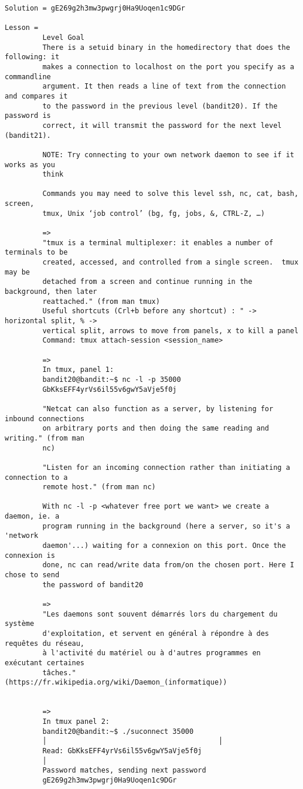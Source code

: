 \documentclass[a4paper]{report}
\begin{document}
\begin{verbatim}
Solution = gE269g2h3mw3pwgrj0Ha9Uoqen1c9DGr

Lesson = 
		 Level Goal
		 There is a setuid binary in the homedirectory that does the following: it
		 makes a connection to localhost on the port you specify as a commandline
		 argument. It then reads a line of text from the connection and compares it
		 to the password in the previous level (bandit20). If the password is 
		 correct, it will transmit the password for the next level (bandit21).
		 
		 NOTE: Try connecting to your own network daemon to see if it works as you
		 think

		 Commands you may need to solve this level ssh, nc, cat, bash, screen, 
		 tmux, Unix ‘job control’ (bg, fg, jobs, &, CTRL-Z, …)

		 => 
		 "tmux is a terminal multiplexer: it enables a number of terminals to be
		 created, accessed, and controlled from a single screen.  tmux may be
		 detached from a screen and continue running in the background, then later
		 reattached." (from man tmux)
		 Useful shortcuts (Crl+b before any shortcut) : " -> horizontal split, % ->
		 vertical split, arrows to move from panels, x to kill a panel
		 Command: tmux attach-session <session_name>

		 =>
		 In tmux, panel 1:
		 bandit20@bandit:~$ nc -l -p 35000
		 GbKksEFF4yrVs6il55v6gwY5aVje5f0j 
		 
		 "Netcat can also function as a server, by listening for inbound connections
		 on arbitrary ports and then doing the same reading and writing." (from man 
		 nc)
		 
		 "Listen for an incoming connection rather than initiating a connection to a 
		 remote host." (from man nc)
		 
		 With nc -l -p <whatever free port we want> we create a daemon, ie. a 
		 program running in the background (here a server, so it's a 'network 
		 daemon'...) waiting for a connexion on this port. Once the connexion is 
		 done, nc can read/write data from/on the chosen port. Here I chose to send 
		 the password of bandit20

		 =>
		 "Les daemons sont souvent démarrés lors du chargement du système 
		 d'exploitation, et servent en général à répondre à des requêtes du réseau, 
		 à l'activité du matériel ou à d'autres programmes en exécutant certaines 
		 tâches." (https://fr.wikipedia.org/wiki/Daemon_(informatique))


		 =>
		 In tmux panel 2:
		 bandit20@bandit:~$ ./suconnect 35000                                      
		 │                                         │
		 Read: GbKksEFF4yrVs6il55v6gwY5aVje5f0j                                    
		 │
		 Password matches, sending next password 
		 gE269g2h3mw3pwgrj0Ha9Uoqen1c9DGr
		 

\end{verbatim}
\end{document}
